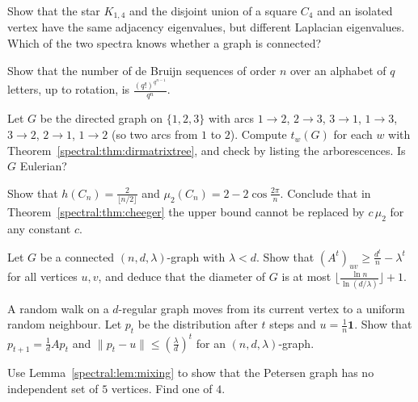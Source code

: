 \begin{exercise}[$\star$]\label{spectral:ex:cospectral}
Show that the star $K_{1,4}$ and the disjoint union of a square $C_4$ and an isolated vertex have the same adjacency eigenvalues, but different Laplacian eigenvalues. Which of the two
spectra knows whether a graph is connected?
\end{exercise}

\begin{exercise}[$\star\star$]\label{spectral:ex:debruijnq}
Show that the number of de Bruijn sequences of order $n$ over an alphabet of $q$ letters, up to rotation, is $\frac{(q!)^{q^{n-1}}}{q^n}$.
\end{exercise}

\begin{exercise}[$\star$]\label{spectral:ex:arborescences}
Let $G$ be the directed graph on $\{1,2,3\}$ with arcs $1\to2$, $2\to3$, $3\to1$, $1\to3$, $3\to2$, $2\to1$, $1\to2$ (so two arcs from $1$ to $2$). Compute $t_w(G)$ for each $w$ with
Theorem~\ref{spectral:thm:dirmatrixtree}, and check by listing the arborescences. Is $G$ Eulerian?
\end{exercise}

\begin{exercise}[$\star$]\label{spectral:ex:cheegercycle}
Show that $h(C_n)=\frac2{\lfloor n/2\rfloor}$ and $\mu_2(C_n)=2-2\cos\frac{2\pi}n$. Conclude that in Theorem~\ref{spectral:thm:cheeger} the upper bound cannot be replaced by $c\,\mu_2$ for any constant $c$.
\end{exercise}

\begin{exercise}[$\star\star$]\label{spectral:ex:diameter}
Let $G$ be a connected $(n,d,\lambda)$-graph with $\lambda<d$. Show that $(A^t)_{uv}\ge\frac{d^t}n-\lambda^t$ for all vertices $u,v$, and deduce that the diameter of $G$ is at most
$\bigl\lfloor\frac{\ln n}{\ln(d/\lambda)}\bigr\rfloor+1$.
\end{exercise}

\begin{exercise}[$\star$]\label{spectral:ex:walkmixing}
A random walk on a $d$-regular graph moves from its current vertex to a uniform random neighbour. Let $p_t$ be the distribution after $t$ steps and $u=\frac1n\mathbf1$. Show that $p_{t+1}=\frac1dAp_t$
and $\|p_t-u\|\le(\frac\lambda d)^t$ for an $(n,d,\lambda)$-graph.
\end{exercise}

\begin{exercise}[$\star$]\label{spectral:ex:petersenalpha}
Use Lemma~\ref{spectral:lem:mixing} to show that the Petersen graph has no independent set of $5$ vertices. Find one of $4$.
\end{exercise}

